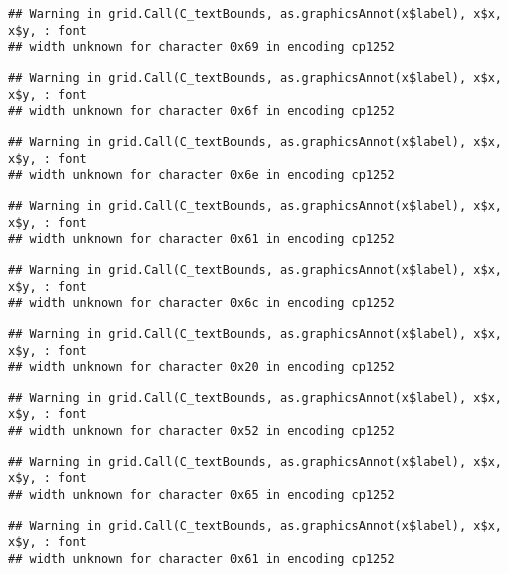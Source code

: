 \documentclass[
]{article}
\begin{document}
\begin{verbatim}
## Warning in grid.Call(C_textBounds, as.graphicsAnnot(x$label), x$x, x$y, : font
## width unknown for character 0x69 in encoding cp1252
\end{verbatim}

\begin{verbatim}
## Warning in grid.Call(C_textBounds, as.graphicsAnnot(x$label), x$x, x$y, : font
## width unknown for character 0x6f in encoding cp1252
\end{verbatim}

\begin{verbatim}
## Warning in grid.Call(C_textBounds, as.graphicsAnnot(x$label), x$x, x$y, : font
## width unknown for character 0x6e in encoding cp1252
\end{verbatim}

\begin{verbatim}
## Warning in grid.Call(C_textBounds, as.graphicsAnnot(x$label), x$x, x$y, : font
## width unknown for character 0x61 in encoding cp1252
\end{verbatim}

\begin{verbatim}
## Warning in grid.Call(C_textBounds, as.graphicsAnnot(x$label), x$x, x$y, : font
## width unknown for character 0x6c in encoding cp1252
\end{verbatim}

\begin{verbatim}
## Warning in grid.Call(C_textBounds, as.graphicsAnnot(x$label), x$x, x$y, : font
## width unknown for character 0x20 in encoding cp1252
\end{verbatim}

\begin{verbatim}
## Warning in grid.Call(C_textBounds, as.graphicsAnnot(x$label), x$x, x$y, : font
## width unknown for character 0x52 in encoding cp1252
\end{verbatim}

\begin{verbatim}
## Warning in grid.Call(C_textBounds, as.graphicsAnnot(x$label), x$x, x$y, : font
## width unknown for character 0x65 in encoding cp1252
\end{verbatim}

\begin{verbatim}
## Warning in grid.Call(C_textBounds, as.graphicsAnnot(x$label), x$x, x$y, : font
## width unknown for character 0x61 in encoding cp1252
\end{verbatim}
\end{document}
